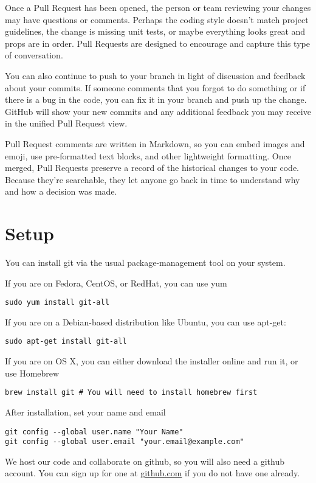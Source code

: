 \documentclass[runningheads,letterpaper]{llncs}
\begin{document}
Once a Pull Request has been opened, the person or team reviewing your changes may have questions or comments.
Perhaps the coding style doesn't match project guidelines, the change is missing unit tests, or maybe everything looks great and props are in order.
Pull Requests are designed to encourage and capture this type of conversation.

You can also continue to push to your branch in light of discussion and feedback about your commits.
If someone comments that you forgot to do something or if there is a bug in the code, you can fix it in your branch and push up the change.
GitHub will show your new commits and any additional feedback you may receive in the unified Pull Request view.

Pull Request comments are written in Markdown, so you can embed images and emoji, use pre-formatted text blocks, and other lightweight formatting.
Once merged, Pull Requests preserve a record of the historical changes to your code.
Because they're searchable, they let anyone go back in time to understand why and how a decision was made.

\section{Setup}

You can install git via the usual package-management tool on your system.

If you are on Fedora, CentOS, or RedHat, you can use yum
\begin{verbatim}
sudo yum install git-all
\end{verbatim}
If you are on a Debian-based distribution like Ubuntu, you can use apt-get:
\begin{verbatim}
sudo apt-get install git-all
\end{verbatim}
If you are on OS X, you can either download the installer online and run it, or use Homebrew
\begin{verbatim}
brew install git # You will need to install homebrew first
\end{verbatim}

After installation, set your name and email
\begin{verbatim}
git config --global user.name "Your Name"
git config --global user.email "your.email@example.com"
\end{verbatim}

We host our code and collaborate on github, so you will also need a github account.
You can sign up for one at \url{github.com} if you do not have one already.
\end{document}
